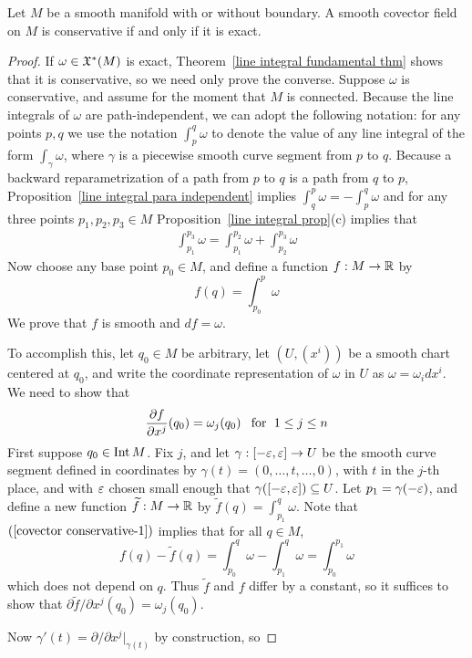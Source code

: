 \begin{proposition}\label{covector conservative iff exact}
Let $M$ be a smooth manifold with or without boundary. A smooth covector field on $M$ is conservative if and only if it is exact.
\end{proposition}
\begin{proof}
If $\omega\in\mathfrak{X}^*(M)$ is exact, Theorem~\ref{line integral fundamental thm} shows that it is conservative, so we need only prove the converse. Suppose $\omega$ is conservative, and assume for the moment that $M$ is connected. Because the line integrals of $\omega$ are path-independent, we can adopt the following notation: for any points $p,q$ we use the notation $\int_p^q\omega$ to denote the value of any line integral of the form $\int_\gamma\omega$, where $\gamma$ is a piecewise smooth curve segment from $p$ to $q$. Because a backward reparametrization of a path from $p$ to $q$ is a path from $q$ to $p$, Proposition~\ref{line integral para independent} implies $\int_q^p\omega=-\int_p^q\omega$ and for any three points $p_1,p_2,p_3\in M$ Proposition~\ref{line integral prop}(c) implies that
\begin{align}\label{covector conservative-1}
\int_{p_1}^{p_3}\omega=\int_{p_1}^{p_2}\omega+\int_{p_2}^{p_3}\omega
\end{align}
Now choose any base point $p_0\in M$, and define a function $f:M\to\mathbb{R}$ by
\[f(q)=\int_{p_0}^{p}\omega\]
We prove that $f$ is smooth and $df=\omega$.\par 
To accomplish this, let $q_0\in M$ be arbitrary, let $(U,(x^i))$ be a smooth chart centered at $q_0$, and write the coordinate representation of $\omega$ in $U$ as $\omega=\omega_idx^i$. We need to show that
\[\frac{\partial f}{\partial x^j}(q_0)=\omega_j(q_0)\hspace{8pt}\text{for}\hspace{6pt} 1\leq j\leq n\]
First suppose $q_0\in\mathrm{Int}\, M$. Fix $j$, and let $\gamma:[-\varepsilon,\varepsilon]\to U$ be the smooth curve segment defined in coordinates by $\gamma(t)=(0,\dots,t,\dots,0)$, with $t$ in the $j$-th place, and with $\varepsilon$ chosen small enough that $\gamma([-\varepsilon,\varepsilon])\subseteq U$. Let $p_1=\gamma(-\varepsilon)$, and define a new function $\widetilde{f}:M\to\mathbb{R}$ by $\widetilde{f}(q)=\int_{p_1}^{q}\omega$. Note that $(\ref{covector conservative-1})$ implies that for all $q\in M$,
\[f(q)-\widetilde{f}(q)=\int_{p_0}^{q}\omega-\int_{p_1}^{q}\omega=\int_{p_0}^{p_1}\omega\]
which does not depend on $q$. Thus $\widetilde{f}$ and $f$ differ by a constant, so it suffices to show that $\partial\widetilde{f}/\partial x^j(q_0)=\omega_j(q_0)$.\par
Now $\gamma'(t)=\partial/\partial x^j|_{\gamma(t)}$ by construction, so 

\end{proof}
